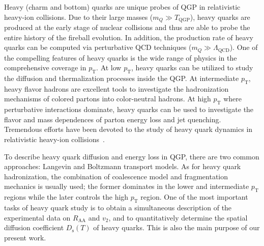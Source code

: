 \documentclass[aps,superscriptaddress,prc,twocolumn,nofootinbib]{revtex4}
\begin{document}
Heavy (charm and bottom) quarks are unique probes of QGP in relativistic heavy-ion collisions.
Due to their large masses ($m_Q \gg T_\mathrm{QGP}$), heavy quarks are produced at the early stage of nuclear collisions and thus are able to probe the entire history of the fireball evolution.
In addition, the production rate of heavy quarks can be computed via perturbative QCD techniques ($m_Q \gg \Lambda_\mathrm{QCD}$).
One of the compelling features of heavy quarks is the wide range of physics in the comprehensive coverage in $p_\mathrm{T}$.
At low $p_\mathrm{T}$, heavy quarks can be utilized to study the diffusion and thermalization processes inside the QGP.
At intermediate $p_\mathrm{T}$, heavy flavor hadrons are excellent tools to investigate the hadronization mechanisms of colored partons into color-neutral hadrons.
At high $p_\mathrm{T}$ where perturbative interactions dominate, heavy quarks can be used to investigate the flavor and mass dependences of parton energy loss and jet quenching.
Tremendous efforts have been devoted to the study of heavy quark dynamics in relativistic heavy-ion collisions~\cite{Dong:2019byy, Rapp:2018qla, Cao:2018ews, Uphoff:2011ad, He:2011qa, Young:2011ug, Alberico:2011zy, Nahrgang:2013saa, Cao:2013ita, Djordjevic:2013xoa, Cao:2015hia, Das:2015ana, Song:2015ykw, Cao:2016gvr, Kang:2016ofv, Prado:2016szr, Cao:2017crw, Liu:2017qah, Li:2018izm, Ke:2018tsh, Katz:2019fkc, Xing:2019xae, Li:2020kax}.


To describe heavy quark diffusion and energy loss in QGP, there are two common approaches: Langevin and Boltzmann transport models.
As for heavy quark hadronization, the combination of coalescence model and fragmentation mechanics is usually used; the former dominates in the lower and intermediate $p_\mathrm{T}$ regions while the later controls the high $p_\mathrm{T}$ region.
One of the most important tasks of heavy quark study is to obtain a simultaneous description of the experimental data on $R_\mathrm{AA}$ and $v_2$, and to quantitatively determine the spatial diffusion coefficient $D_\mathrm{s}(T)$ of heavy quarks. This is also the main purpose of our present work.
\end{document}
